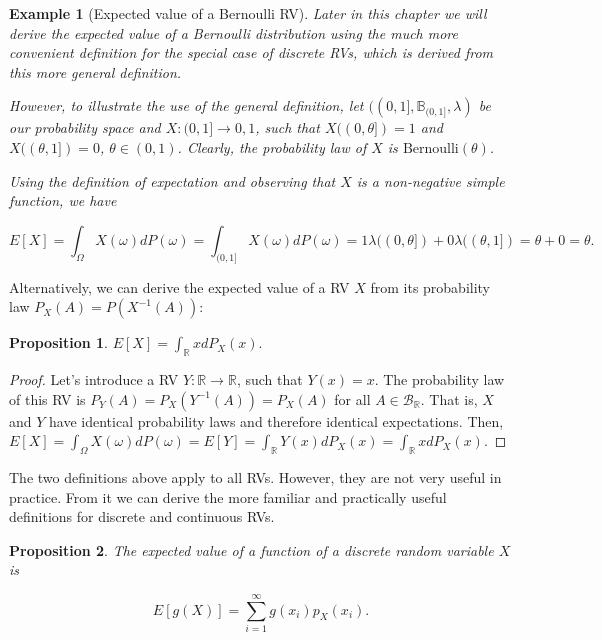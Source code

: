 \documentclass{book}
\theoremstyle{plain}%
\newtheorem{prototheorem}{Example}[section]
\newenvironment{cexample}
   {\colorlet{shadecolor}{gray!10}\begin{shaded}\begin{prototheorem}}
   {\end{prototheorem}\end{shaded}}
\newtheorem{proposition}{Proposition}[section]
\theoremstyle{definition}
\newlength{\arrow}
\begin{document}
\begin{cexample}[Expected value of a Bernoulli RV]
Later in this chapter we will derive the expected value of a Bernoulli distribution using the much more convenient definition for the special case of discrete RVs, which is derived from this more general definition.

However, to illustrate the use of the general definition, let $((0,1], \mathbb{B}_{(0,1]}, \lambda)$ be our probability space and $X: (0,1] \rightarrow {0,1}$, such that $X((0,\theta]) = 1$ and  $X((\theta, 1]) = 0$, $\theta \in (0,1)$. Clearly, the probability law of $X$ is $\text{Bernoulli}(\theta)$.

Using the definition of expectation and observing that $X$ is a non-negative simple function, we have

$$E[X] = \int_{\Omega} X(\omega)dP(\omega) = \int_{(0,1]} X(\omega)dP(\omega) = 1\lambda((0,\theta]) + 0\lambda((\theta,1]) = \theta + 0 = \theta.$$
\end{cexample}


Alternatively, we can derive the expected value of a RV $X$ from its probability law $P_X(A) = P(X^{-1}(A))$:

\begin{proposition}
$E[X] = \int_{\mathbb{R}} x dP_X(x).$\label{prop:exp_law}
\end{proposition}

\begin{proof}
Let's introduce a RV $Y: \mathbb{R} \rightarrow \mathbb{R}$, such that $Y(x) = x$. The probability law of this RV is $P_Y(A) = P_X(Y^{-1}(A)) = P_X(A)$ for all $A \in \mathcal{B}_\mathbb{R}$. That is, $X$ and $Y$ have identical probability laws and therefore identical expectations. Then, $E[X] = \int_{\Omega} X(\omega)dP(\omega) = E[Y] = \int_{\mathbb{R}} Y(x)dP_X(x) = \int_{\mathbb{R}} x dP_X(x) $.

\end{proof}

The two definitions above apply to all RVs. However, they are not very useful in practice. From it we can derive the more familiar and practically useful definitions for discrete and continuous RVs.

\begin{proposition}
The expected value of a function of a discrete random variable $X$ is

$$E[g(X)] = \sum_{i=1}^\infty g(x_i) p_X(x_i).$$
\end{proposition}
\end{document}
